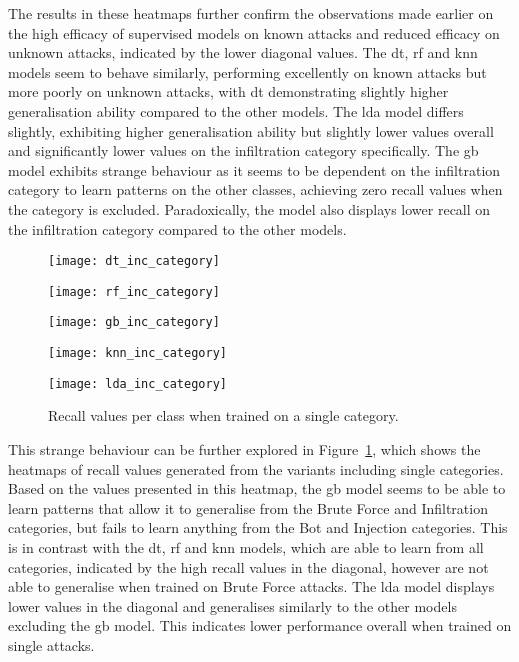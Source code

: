 The results in these heatmaps further confirm the observations made earlier on
the high efficacy of supervised models on known attacks and reduced efficacy on
unknown attacks, indicated by the lower diagonal values. The \gls{dt}, \gls{rf}
and \gls{knn} models seem to behave similarly, performing excellently on
known attacks but more poorly on unknown attacks, with \gls{dt} demonstrating
slightly higher generalisation ability compared to the other models. The
\gls{lda} model differs slightly, exhibiting higher generalisation ability but
slightly lower values overall and significantly lower values on the
infiltration category specifically. The \gls{gb} model exhibits strange
behaviour as it seems to be dependent on the infiltration category to learn
patterns on the other classes, achieving zero recall values when the category
is excluded. Paradoxically, the model also displays lower recall on the
infiltration category compared to the other models.
%
\begin{figure}[htbp]
    \centering
    \begin{minipage}[h]{0.5\textwidth}
        \centering
        \texttt{[image: dt\_inc\_category]}
    \end{minipage}\hfill
    \begin{minipage}[h]{0.5\textwidth}
        \centering
        \texttt{[image: rf\_inc\_category]}
    \end{minipage}
    \begin{minipage}[h]{0.5\textwidth}
        \centering
        \texttt{[image: gb\_inc\_category]}
    \end{minipage}\hfill
    \begin{minipage}[h]{0.5\textwidth}
        \centering
        \texttt{[image: knn\_inc\_category]}
    \end{minipage}
    \begin{minipage}[h]{0.5\textwidth}
        \centering
        \texttt{[image: lda\_inc\_category]}
    \end{minipage}
    \caption[Single Category Results]{Recall values per class when trained on a single category.\label{fig:inc_cat}}
\end{figure}
% 
This strange behaviour can be further explored in Figure~\ref{fig:inc_cat},
which shows the heatmaps of recall values generated from the variants including
single categories. Based on the values presented in this heatmap, the \gls{gb}
model seems to be able to learn patterns that allow it to generalise from the
Brute Force and Infiltration categories, but fails to learn anything from the
Bot and Injection categories. This is in contrast with the \gls{dt}, \gls{rf}
and \gls{knn} models, which are able to learn from all categories, indicated by
the high recall values in the diagonal, however are not able to generalise when
trained on Brute Force attacks. The \gls{lda} model displays lower values in
the diagonal and generalises similarly to the other models excluding the
\gls{gb} model. This indicates lower performance overall when trained on single
attacks.

